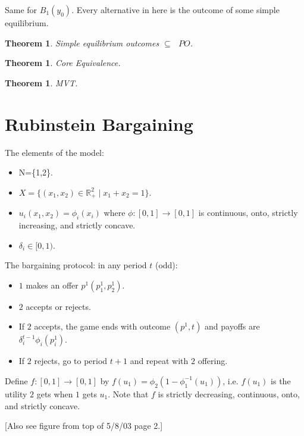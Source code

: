 \documentclass[12pt]{article}
\newtheorem{theo}[propo]{Theorem}
\newcommand{\n}{\noindent}
\newcommand{\s}{\vspace{5mm}}
\begin{document}
\s
\n  Same for $B_1(y_0)$.  Every alternative in here is the outcome of some simple equilibrium.  

\s
\n  \begin{theo}  Simple equilibrium outcomes $\subseteq\mbox{ }PO$.
\end{theo}

\s
\n\begin{theo}  Core Equivalence.
\end{theo}

\s
\n\begin{theo}  MVT.
\end{theo}

\section{Rubinstein Bargaining}
\s
\n  The elements of the model:
\begin{itemize}
\item  N=\{1,2\}.
\item $X=\{(x_1,x_2)\in\mathbb{R}^2_+\mid x_1+x_2=1\}$.
\item $u_i(x_1,x_2)=\phi_i(x_i)$ where $\phi:[0,1]\longrightarrow[0,1]$ is continuous, onto, strictly increasing, and strictly concave.
\item $\delta_i\in[0,1)$.
\end{itemize}

\s
\n  The bargaining protocol: in any period $t$ (odd):
\begin{itemize}
\item $1$ makes an offer $p^1(p_1^1,p_2^1)$.
\item $2$ accepts or rejects.
\item If $2$ accepts, the game ends with outcome $(p^1,t)$ and payoffs are $\delta_i^{t-1}\phi_i(p_i^1)$.
\item If $2$ rejects, go to period $t+1$ and repeat with $2$ offering.
\end{itemize}

\s
\n  Define $f:[0,1]\longrightarrow[0,1]$ by $f(u_1)=\phi_2(1-\phi_1^{-1}(u_1))$, i.e. $f(u_1)$ is the utility $2$ gets when $1$ gets $u_1$.  Note that $f$ is strictly decreasing, continuous, onto, and strictly concave.
\begin{center}
[Also see figure from top of 5/8/03 page 2.]
\end{center}
\end{document}

